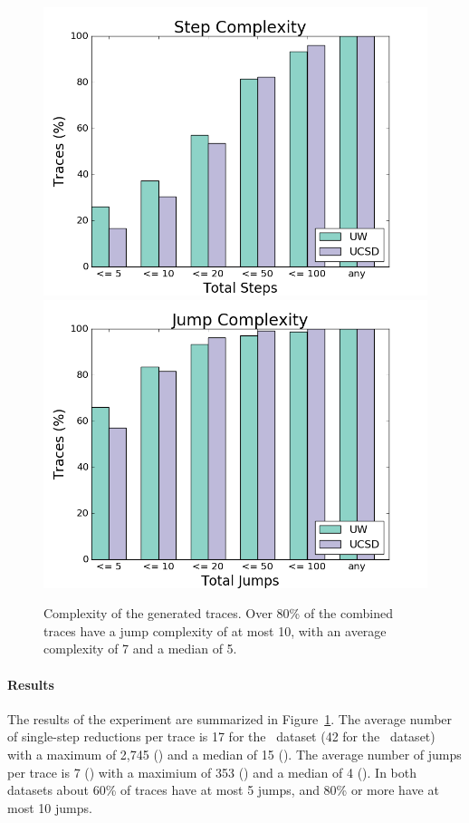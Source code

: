 %
\begin{figure}[t]
\includegraphics[width=0.7\linewidth]{trace_size_step.png}
\includegraphics[width=0.7\linewidth]{trace_size_jump.png}
\caption{Complexity of the generated traces. Over 80\% of the combined traces
  have a jump complexity of at most 10, with an average complexity of 7
  and a median of 5.}
\label{fig:results-complexity}
\end{figure}
%
\paragraph{Results}
\label{sec:results-complexity}
The results of the experiment are summarized in
Figure~\ref{fig:results-complexity}.
%
The average number of single-step reductions per trace is 17 for the
\ucsdbench\ dataset (42 for the \uwbench\ dataset) with a maximum of
2,745 () and a median of 15 ().
%
The average number of jumps per trace is 7 () with a
maximium of 353 () and a median of 4 ().
%
In both datasets about 60\% of traces have at most 5 jumps, and 80\% or more
have at most 10 jumps.


